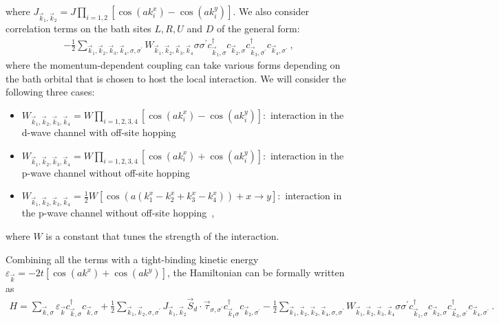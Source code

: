 \documentclass{revtex4-2}
\begin{document}
where \(J_{\vec k_1, \vec k_2} = J\prod_{i=1,2}\left[\cos\left( ak_i^x \right) - \cos\left( ak_i^y \right) \right]\).
We also consider correlation terms on the bath sites \(L,R,U\) and \(D\) of the general form:
\begin{equation}\begin{aligned}
-\frac{1}{2}\sum_{\vec k_1,\vec k_2, \vec k_3, \vec k_4,\sigma,\sigma^\prime}W_{\vec k_1,\vec k_2,\vec k_3,\vec k_4} \sigma\sigma^\prime c^\dagger_{\vec k_1,\sigma}c_{\vec k_2,\sigma}c^\dagger_{\vec k_3,\sigma^\prime}c_{\vec k_4,\sigma^\prime}~,
\end{aligned}\end{equation}
where the momentum-dependent coupling can take various forms depending on the bath orbital that is chosen to host the local interaction. We will consider the following three cases:
\begin{itemize}
		\item \(W_{\vec k_1,\vec k_2,\vec k_3,\vec k_4} = W\prod_{i=1,2,3,4}\left[\cos\left( ak_i^x \right) - \cos\left( ak_i^y \right) \right]\):~interaction in the d-wave channel with off-site hopping
		\item \(W_{\vec k_1,\vec k_2,\vec k_3,\vec k_4} = W\prod_{i=1,2,3,4}\left[\cos\left( ak_i^x \right) + \cos\left( ak_i^y \right) \right]\):~interaction in the p-wave channel without off-site hopping
		\item \(W_{\vec k_1,\vec k_2,\vec k_3,\vec k_4} = \frac{1}{2}W\left[\cos\left(a\left(k_1^x - k_2^x + k_3^x - k_4^x\right)\right) + x \to y\right]\):~interaction in the p-wave channel without off-site hopping~,
\end{itemize}
where \(W\) is a constant that tunes the strength of the interaction.

Combining all the terms with a tight-binding kinetic energy \(\varepsilon_{\vec k} = -2t\left[\cos\left(ak^x\right) + \cos\left(ak^y\right)\right]\), the Hamiltonian can be formally written as
\begin{equation}\begin{aligned}
	H = \sum_{\vec k,\sigma}\varepsilon_{\vec k}c^\dagger_{\vec k,\sigma}c_{\vec k,\sigma} + \frac{1}{2}\sum_{\vec k_1, \vec k_2, \sigma,\sigma^\prime}J_{\vec k_1, \vec k_2}\vec{S}_d\cdot\vec{\tau}_{\sigma,\sigma^\prime}c^\dagger_{\vec k_1\sigma}c_{\vec k_2,\sigma^\prime} - \frac{1}{2}\sum_{\vec k_1,\vec k_2, \vec k_3, \vec k_4,\sigma,\sigma^\prime}W_{\vec k_1,\vec k_2,\vec k_3,\vec k_4} \sigma\sigma^\prime c^\dagger_{\vec k_1,\sigma}c_{\vec k_2,\sigma}c^\dagger_{\vec k_3,\sigma^\prime}c_{\vec k_4,\sigma^\prime}~.
\end{aligned}\end{equation}
\end{document}

